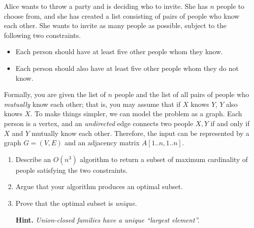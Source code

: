 \documentclass{article}
\begin{document}
\begin{question}
Alice wants to throw a party and is deciding who to invite. She has $n$ people to choose from, and she has created a list consisting of pairs of people who know each other. She wants to invite as many people as possible, subject to  the following two constraints.
\begin{itemize}
    \item Each person should have at least five other people whom they know.
    \item Each person should also have at least five other people whom they do not know.
\end{itemize}

Formally, you are given the list of $n$ people and the list of all pairs of people who {\em mutually} know each other; that is, you may assume that if $X$ knows $Y$, $Y$ also knows $X$. To make things simpler, we can model the problem as a graph. Each person is a vertex, and an {\em undirected} edge connects two people $X, Y$ if and only if $X$ and $Y$ mutually know each other. Therefore, the input can be represented by a graph $G = (V, E)$ and an adjacency matrix $A[1..n, 1..n]$.

\begin{enumerate}[label = (\alph*)]
    \item Describe an $O(n^3)$ algorithm to return a subset of maximum cardinality of people satisfying the two constraints.

    \item Argue that your algorithm produces an optimal subset.

    \item Prove that the optimal subset is {\em unique}.

    {\bfseries Hint.} {\em Union-closed families have a unique ``largest element''.}
\end{enumerate}
\end{question}
\end{document}
